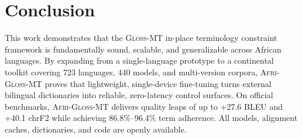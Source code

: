 \documentclass[10pt,twocolumn]{article}
\newcommand{\gm}{\textsc{Gloss-MT}}
\newcommand{\agm}{\textsc{Afri-Gloss-MT}}
\begin{document}
\section{Conclusion}

This work demonstrates that the \gm{} in-place terminology constraint framework is fundamentally sound, scalable, and generalizable across African languages. By expanding from a single-language prototype to a continental toolkit covering 723 languages, 440 models, and multi-version corpora, \agm{} proves that lightweight, single-device fine-tuning turns external bilingual dictionaries into reliable, zero-latency control surfaces. On official benchmarks, \agm{} delivers quality leaps of up to +27.6 BLEU and +40.1 chrF2 while achieving 86.8\%--96.4\% term adherence. All models, alignment caches, dictionaries, and code are openly available.



\end{document}
